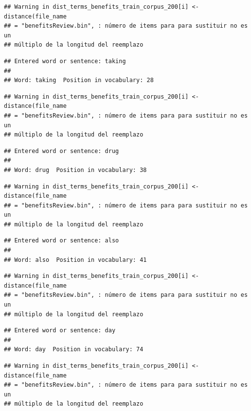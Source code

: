 \documentclass[spanish,]{article}
\begin{document}
\begin{verbatim}
## Warning in dist_terms_benefits_train_corpus_200[i] <- distance(file_name
## = "benefitsReview.bin", : número de items para para sustituir no es un
## múltiplo de la longitud del reemplazo
\end{verbatim}

\begin{verbatim}
## Entered word or sentence: taking
## 
## Word: taking  Position in vocabulary: 28
\end{verbatim}

\begin{verbatim}
## Warning in dist_terms_benefits_train_corpus_200[i] <- distance(file_name
## = "benefitsReview.bin", : número de items para para sustituir no es un
## múltiplo de la longitud del reemplazo
\end{verbatim}

\begin{verbatim}
## Entered word or sentence: drug
## 
## Word: drug  Position in vocabulary: 38
\end{verbatim}

\begin{verbatim}
## Warning in dist_terms_benefits_train_corpus_200[i] <- distance(file_name
## = "benefitsReview.bin", : número de items para para sustituir no es un
## múltiplo de la longitud del reemplazo
\end{verbatim}

\begin{verbatim}
## Entered word or sentence: also
## 
## Word: also  Position in vocabulary: 41
\end{verbatim}

\begin{verbatim}
## Warning in dist_terms_benefits_train_corpus_200[i] <- distance(file_name
## = "benefitsReview.bin", : número de items para para sustituir no es un
## múltiplo de la longitud del reemplazo
\end{verbatim}

\begin{verbatim}
## Entered word or sentence: day
## 
## Word: day  Position in vocabulary: 74
\end{verbatim}

\begin{verbatim}
## Warning in dist_terms_benefits_train_corpus_200[i] <- distance(file_name
## = "benefitsReview.bin", : número de items para para sustituir no es un
## múltiplo de la longitud del reemplazo
\end{verbatim}
\end{document}
